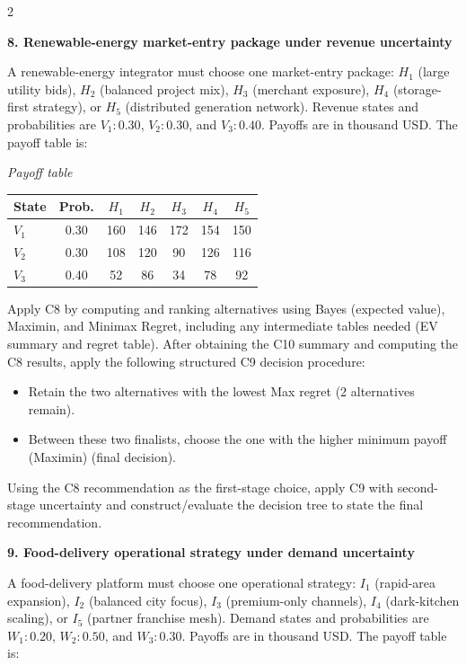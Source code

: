 \documentclass[12pt]{article}
\newcommand{\SubsectionBox}[1]{%
	\noindent\colorbox{gray!30}{%
		\parbox{\linewidth}{\textbf{#1}}%
	}\par\vspace{0.35cm}%
}
\begin{document}
\begin{multicols}{2}
		\vspace{0.25cm}
		\SubsectionBox{8. Renewable-energy market-entry package under revenue uncertainty}\vspace{-0.25cm}
		A renewable-energy integrator must choose one market-entry package: $H_1$ (large utility bids), $H_2$ (balanced project mix), $H_3$ (merchant exposure), $H_4$ (storage-first strategy), or $H_5$ (distributed generation network).
		Revenue states and probabilities are $V_1:0.30$, $V_2:0.30$, and $V_3:0.40$. Payoffs are in thousand USD. The payoff table is:
		
		\begin{center}
			\textit{Payoff table} \\
			\begin{tabular}{l c c c c c c}
				\hline
				State& Prob. & $H_1$ & $H_2$ & $H_3$ & $H_4$ & $H_5$ \\
				\hline
				$V_1$ & 0.30 & 160 & 146 & 172 & 154 & 150 \\
				$V_2$ & 0.30 & 108 & 120 & 90 & 126 & 116 \\
				$V_3$ & 0.40 & 52 & 86 & 34 & 78 & 92 \\
				\hline
			\end{tabular}
		\end{center}
		
		Apply C8 by computing and ranking alternatives using Bayes (expected value), Maximin, and Minimax Regret, including any intermediate tables needed (EV summary and regret table).
		After obtaining the C10 summary and computing the C8 results, apply the following structured C9 decision procedure:
		\begin{itemize}
			\item Retain the two alternatives with the lowest Max regret (2 alternatives remain).
			\item Between these two finalists, choose the one with the higher minimum payoff (Maximin) (final decision).
		\end{itemize}
		Using the C8 recommendation as the first-stage choice, apply C9 with second-stage uncertainty and construct/evaluate the decision tree to state the final recommendation.

		\vspace{0.25cm}
		\SubsectionBox{9. Food-delivery operational strategy under demand uncertainty}\vspace{-0.25cm}
		A food-delivery platform must choose one operational strategy: $I_1$ (rapid-area expansion), $I_2$ (balanced city focus), $I_3$ (premium-only channels), $I_4$ (dark-kitchen scaling), or $I_5$ (partner franchise mesh).
		Demand states and probabilities are $W_1:0.20$, $W_2:0.50$, and $W_3:0.30$. Payoffs are in thousand USD. The payoff table is:
		

\end{multicols}
\end{document}
